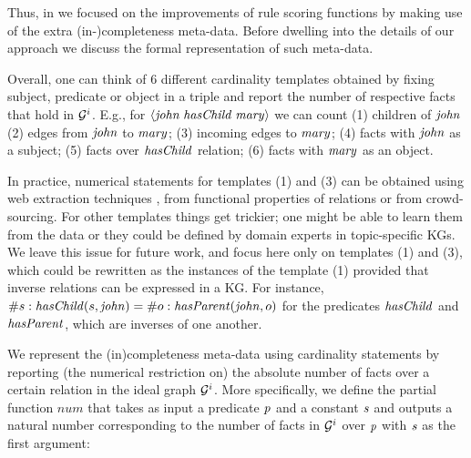 Thus, in %
\cite{carl} we focused on the improvements of rule scoring functions by making use of the extra (in-)completeness meta-data. 
Before dwelling into the details of our approach we discuss the formal representation of such meta-data. 

Overall, one can think of 6 different cardinality templates obtained by fixing subject, predicate or object in a triple and report the number of respective facts that hold in $\mathcal{G}^i$. 
E.g., for $\mathit{\langle john\;hasChild\;mary\rangle}$ we %
can count
(1) children of $\mathit{john}$ %
(2) edges from $\mathit{john}$ to $\mathit{mary}$; %
(3) incoming edges to $\mathit{mary}$; %
(4) %
facts with $\mathit{john}$ as a subject; (5) %
facts over $\mathit{hasChild}$ relation; (6) %
facts with $\mathit{mary}$ as an object. 

In practice, numerical statements for templates (1) and (3) can be obtained using web extraction techniques \cite{cardinality-extraction-iswc-2016}, from functional properties of relations or from crowd-sourcing. For other templates things get trickier; one might be able to learn  
them from the data or they could be defined by domain experts in topic-specific KGs. We leave this issue for future work, and focus here only on templates (1) and (3), which could be rewritten as the instances of the template (1) provided that inverse relations can be expressed in a KG. For instance, $\# s: \mathit{hasChild}(s,\mathit{john})=\# o: \mathit{hasParent}(\mathit{john},o)$ for the predicates $\mathit{hasChild}$ and $\mathit{hasParent}$, which are %
inverses of one another. %

We represent the (in)completeness meta-data using cardinality statements by reporting (the numerical restriction on) the absolute number of facts over a certain relation in the ideal graph $\mathcal{G}^i$. More specifically, we define the partial function $num$ that takes as input a predicate $\mathit{p}$ and a constant $\mathit{s}$ and outputs a natural number corresponding to the number of facts in $\mathcal{G}^i$ over $\mathit{p}$ with $\mathit{s}$ as the first argument: 

